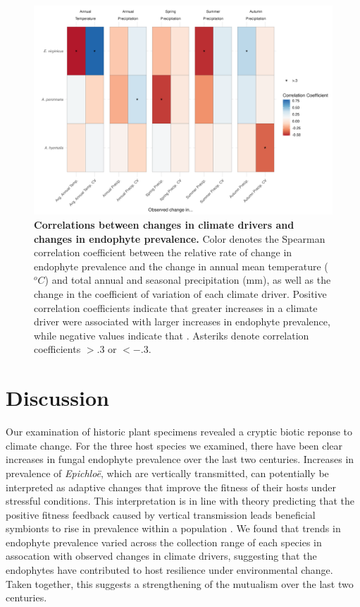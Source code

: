 \documentclass[11pt]{article}
\let\cite\citep
\begin{document}
\begin{figure}[H]
	\centering
	\includegraphics[width = \linewidth]{climate_corr_heatmap.png}
	\caption{\textbf{Correlations between changes in climate drivers and changes in endophyte prevalence.} Color denotes the Spearman correlation coefficient between the relative rate of change in endophyte prevalence and the change in annual mean temperature ($^oC$) and total annual and seasonal precipitation (mm), as well as the change in the coefficient of variation of each climate driver. Positive correlation coefficients indicate that greater increases in a climate driver were associated with larger increases in endophyte prevalence, while negative values indicate that . Asteriks denote correlation coefficients $> .3$ or $< -.3$.}
\end{figure}

\section*{Discussion}
Our examination of historic plant specimens revealed a cryptic biotic reponse to climate change. 
For the three host species we examined, there have been clear increases in fungal endophyte prevalence over the last two centuries.
Increases in prevalence of \emph{Epichloë}, which are vertically transmitted, can potentially be interpreted as adaptive changes that improve the fitness of their hosts under stressful conditions.
This interpretation is in line with theory predicting that the positive fitness feedback caused by vertical transmission leads beneficial symbionts to rise in prevalence within a population \cite{fine1975vectors}.
We found that trends in endophyte prevalence varied across the collection range of each species in assocation with observed changes in climate drivers, suggesting that the endophytes have contributed to host resilience under environmental change.
Taken together, this suggests a strengthening of the mutualism over the last two centuries.
\end{document}

